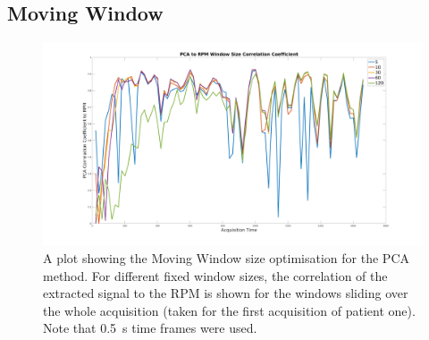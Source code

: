     \subsection{Moving Window} \label{sec:moving_window}
        \begin{figure}
            
            \centering
            
            \includegraphics[width=1.0\linewidth]{figures/pca_window_correlation_coefficient.png}
            
            
            \captionsetup{singlelinecheck=false, justification=centering}
            \caption{
            A plot showing the Moving Window size optimisation for the \gls{PCA} method. For different fixed window sizes, the correlation of the extracted signal  to the \gls{RPM}  is shown for the windows sliding over the whole acquisition (taken for the first acquisition of patient one). Note that \SI{0.5}{s} time frames were used.}
            
            \label{fig:pca_window_correlation_coefficient}
            
        \end{figure}
            
            
            
